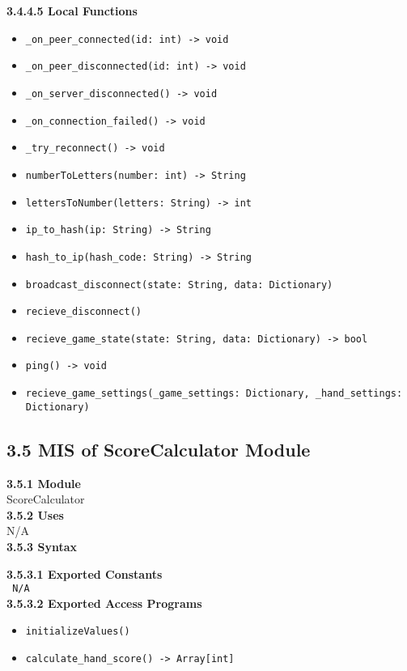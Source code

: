 \documentclass[12pt, titlepage]{article}
\begin{document}
\textbf{3.4.4.5 Local Functions}
\begin{itemize}
    \item \texttt{\_on\_peer\_connected(id: int) -> void}
    \item \texttt{\_on\_peer\_disconnected(id: int) -> void}
    \item \texttt{\_on\_server\_disconnected() -> void}
    \item \texttt{\_on\_connection\_failed() -> void}
    \item \texttt{\_try\_reconnect() -> void}
    \item \texttt{numberToLetters(number: int) -> String}
    \item \texttt{lettersToNumber(letters: String) -> int}
    \item \texttt{ip\_to\_hash(ip: String) -> String}
    \item \texttt{hash\_to\_ip(hash\_code: String) -> String}
    \item \texttt{broadcast\_disconnect(state: String, data: Dictionary)}
    \item \texttt{recieve\_disconnect()}
    \item \texttt{recieve\_game\_state(state: String, data: Dictionary) -> bool}
    \item \texttt{ping() -> void}
    \item \texttt{recieve\_game\_settings(\_game\_settings: Dictionary, \_hand\_settings: Dictionary)}
\end{itemize}


\subsection*{3.5 MIS of ScoreCalculator Module}
\textbf{3.5.1 Module}\\
 ScoreCalculator\\

\noindent \textbf{3.5.2 Uses}\\
N/A \\

\noindent \textbf{3.5.3 Syntax}

\noindent \textbf{3.5.3.1 Exported Constants}\\

\texttt{ N/A}\\

\textbf{3.5.3.2 Exported Access Programs}
\begin{itemize}
	\item \texttt{initializeValues()}
	\item \texttt{calculate\_hand\_score() -> Array[int]}
	
\end{itemize}
\end{document}
